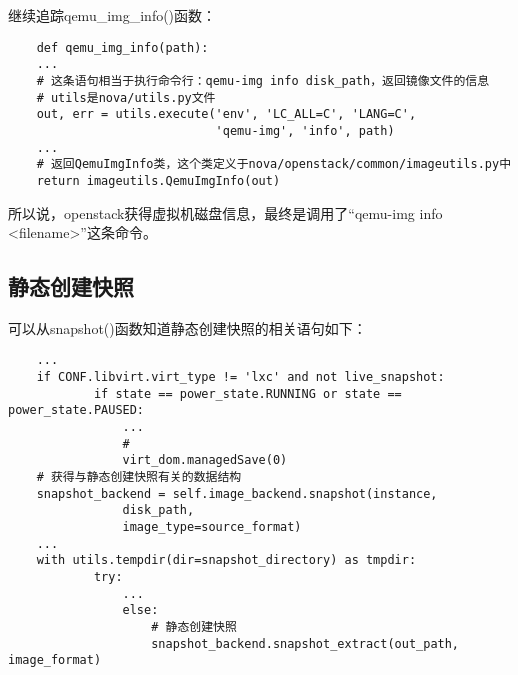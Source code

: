\documentclass[a4paper,left=1.5cm,right=1.5cm,11pt]{article}
\begin{document}
	继续追踪qemu\_img\_info()函数：
	\begin{lstlisting}
	def qemu_img_info(path):
    ...
	# 这条语句相当于执行命令行：qemu-img info disk_path，返回镜像文件的信息
	# utils是nova/utils.py文件
    out, err = utils.execute('env', 'LC_ALL=C', 'LANG=C',
                             'qemu-img', 'info', path)
    ...
	# 返回QemuImgInfo类，这个类定义于nova/openstack/common/imageutils.py中
    return imageutils.QemuImgInfo(out)
	\end{lstlisting}

	所以说，openstack获得虚拟机磁盘信息，最终是调用了“qemu-img info <filename>”这条命令。

\subsection{静态创建快照}
	可以从snapshot()函数知道静态创建快照的相关语句如下：
	\begin{lstlisting}
	...
	if CONF.libvirt.virt_type != 'lxc' and not live_snapshot:
            if state == power_state.RUNNING or state == power_state.PAUSED:
                ...
				# 
                virt_dom.managedSave(0)
	# 获得与静态创建快照有关的数据结构
	snapshot_backend = self.image_backend.snapshot(instance,
                disk_path,
                image_type=source_format)
	...
	with utils.tempdir(dir=snapshot_directory) as tmpdir:
            try:
				...
                else:
					# 静态创建快照
                    snapshot_backend.snapshot_extract(out_path, image_format)
	\end{lstlisting}

\clearpage
\end{document}

